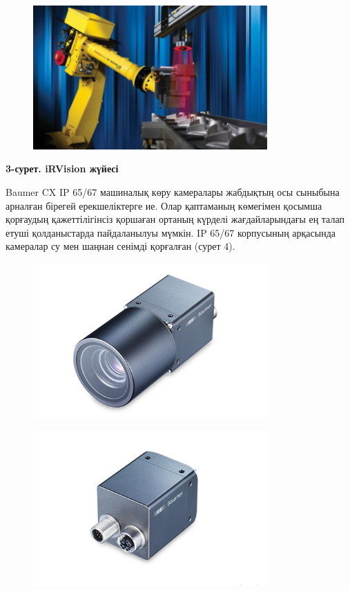 \begin{figure}[H]
	\centering
	\includegraphics[width=0.8\textwidth]{media/ict2/image170}
	\caption*{}
\end{figure}


{\bfseries 3-сурет. iRVision жүйесі}

Baumer CX IP 65/67 машиналық көру камералары жабдықтың осы сыныбына
арналған бірегей ерекшеліктерге ие. Олар қаптаманың көмегімен қосымша
қорғаудың қажеттілігінсіз қоршаған ортаның күрделі жағдайларындағы ең
талап етуші қолданыстарда пайдаланылуы мүмкін. IP 65/67 корпусының
арқасында камералар су мен шаңнан сенімді қорғалған (сурет 4).


\begin{figure}[H]
	\centering
	\includegraphics[width=0.8\textwidth]{media/ict2/image171}
	\caption*{}
\end{figure}

\begin{figure}[H]
	\centering
	\includegraphics[width=0.8\textwidth]{media/ict2/image172}
	\caption*{}
\end{figure}


